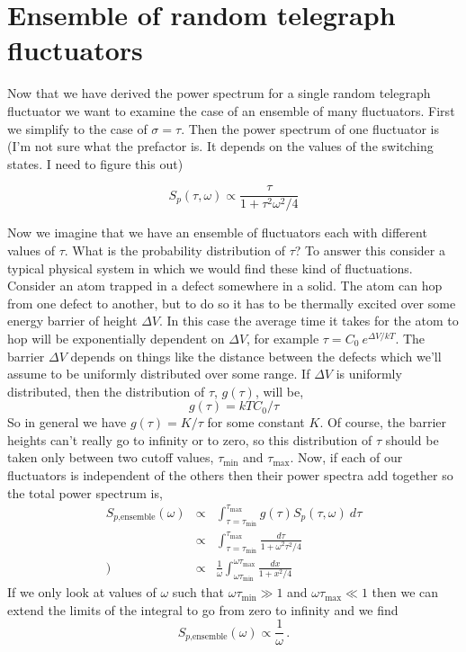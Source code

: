 \documentclass{article}
\begin{document}
\section{Ensemble of random telegraph fluctuators}

Now that we have derived the power spectrum for a single random telegraph fluctuator we want to examine the case of an ensemble of many fluctuators.
First we simplify to the case of $\sigma=\tau$.
Then the power spectrum of one fluctuator is (I'm not sure what the prefactor is. It depends on the values of the switching states. I need to figure this out)

\begin{equation*}
  S_{p}(\tau,\omega) \propto \frac{\tau}{1+\tau^{2}\omega^{2}/4}
\end{equation*}

Now we imagine that we have an ensemble of fluctuators each with different values of $\tau$.
What is the probability distribution of $\tau$?
To answer this consider a typical physical system in which we would find these kind of fluctuations.
Consider an atom trapped in a defect somewhere in a solid.
The atom can hop from one defect to another, but to do so it has to be thermally excited over some energy barrier of height $\Delta V$.
In this case the average time it takes for the atom to hop will be exponentially dependent on $\Delta V$, for example $\tau=C_{0}~e^{\Delta V/kT}$.
The barrier $\Delta V$ depends on things like the distance between the defects which we'll assume to be uniformly distributed over some range.
If $\Delta V$ is uniformly distributed, then the distribution of $\tau$, $g(\tau)$, will be,
\begin{equation*}
  g(\tau)=kTC_{0}/\tau
\end{equation*}
So in general we have $g(\tau)=K/\tau$ for some constant $K$.
Of course, the barrier heights can't really go to infinity or to zero, so this distribution of $\tau$ should be taken only between two cutoff values, $\tau_{\textrm{min}}$ and $\tau_{\textrm{max}}$.
Now, if each of our fluctuators is independent of the others then their power spectra add together so the total power spectrum is,
\begin{eqnarray*}
  S_{p\textrm{,ensemble}}(\omega)
  & \propto & \int_{\tau=\tau_{\textrm{min}}}^{\tau_{\textrm{max}}}g(\tau)S_{p}(\tau,\omega)~d\tau\\
  & \propto & \int_{\tau=\tau_{\textrm{min}}}^{\tau_{\textrm{max}}}\frac{d\tau}{1+\omega^{2}\tau^{2}/4} \\
) & \propto & \frac{1}{\omega} \int_{\omega\tau_{\textrm{min}}}^{\omega\tau_{\textrm{max}}} \frac{dx}{1+x^2/4}
\end{eqnarray*}
If we only look at values of $\omega$ such that $\omega\tau_{\textrm{min}} \gg 1$  and $\omega\tau_{\textrm{max}} \ll1$ then we can extend the limits of the integral to go from zero to infinity and we find
\begin{equation*}
  S_{p\textrm{,ensemble}}(\omega) \propto \frac{1}{\omega} \, .
\end{equation*}
\end{document}
